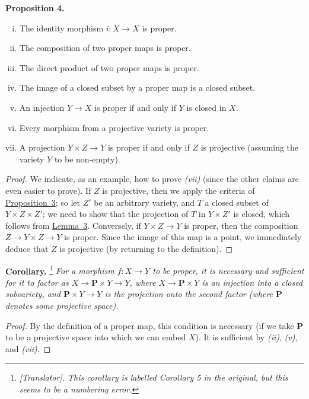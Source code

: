 \documentclass{article}
\newenvironment{itenv}[1]
  {\phantomsection\par\medskip\noindent\textbf{#1.}\itshape}
  {\medskip}
\newcommand{\PP}{\mathbf{P}}
\begin{document}
\begin{itenv}{Proposition 4}
\label{proposition4}
  \begin{enumerate}[(i)]
    \item The identity morphism $i\colon X\to X$ is proper.
    \item The composition of two proper maps is proper.
    \item The direct product of two proper maps is proper.
    \item The image of a closed subset by a proper map is a closed subset.
    \item An injection $Y\to X$ is proper if and only if $Y$ is closed in $X$.
    \item Every morphism from a projective variety is proper.
    \item A projection $Y\times Z\to Y$ is proper if and only if $Z$ is projective (assuming the variety $Y$ to be non-empty).
  \end{enumerate}
\end{itenv}

\begin{proof}
  We indicate, as an example, how to prove \emph{(vii)} (since the other claims are even easier to prove).
  If $Z$ is projective, then we apply the criteria of \hyperref[proposition3]{Proposition~3};
  so let $Z'$ be an arbitrary variety, and $T$ a closed subset of $Y\times Z\times Z'$;
  we need to show that the projection of $T$ in $Y\times Z'$ is closed, which follows from \hyperref[lemma3]{Lemma~3}.
  Conversely, if $Y\times Z\to Y$ is proper, then the composition $Z\to Y\times Z\to Y$ is proper.
  Since the image of this map is a point, we immediately deduce that $Z$ is projective (by returning to the definition).
\end{proof}

\begin{itenv}{Corollary}
\label{corollary5}
  \footnote{\emph{[Translator]. This corollary is labelled \emph{Corollary 5} in the original, but this seems to be a numbering error.}}
  For a morphism $f\colon X\to Y$ to be proper, it is necessary and sufficient for it to factor as $X\to \PP\times Y\to Y$, where $X\to \PP\times Y$ is an injection into a closed subvariety, and $\PP\times Y\to Y$ is the projection onto the second factor (where $\PP$ denotes some projective space).
\end{itenv}

\begin{proof}
  By the definition of a proper map, this condition is necessary (if we take $\PP$ to be a projective space into which we can embed $X$).
  It is sufficient by \emph{(ii)}, \emph{(v)}, and \emph{(vii)}.
\end{proof}
\end{document}
